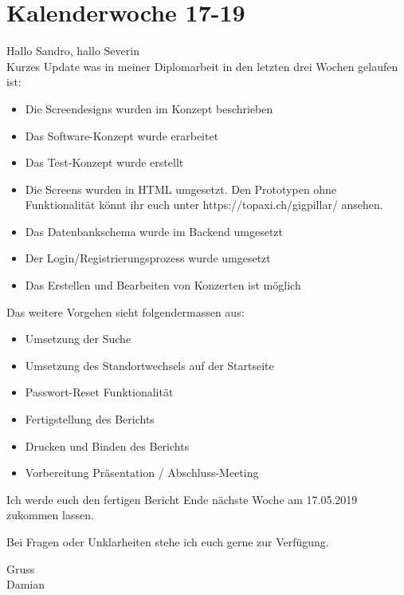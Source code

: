 \section{Kalenderwoche 17-19}

Hallo Sandro, hallo Severin\\

\noindent
Kurzes Update was in meiner Diplomarbeit in den letzten drei
Wochen gelaufen ist:

\begin{itemize}
  \tightlist{}
  \item{}Die Screendesigns wurden im Konzept beschrieben
  \item{}Das Software-Konzept wurde erarbeitet
  \item{}Das Test-Konzept wurde erstellt
  \item{}
    Die Screens wurden in HTML umgesetzt.
    Den Prototypen ohne Funktionalität könnt ihr euch unter
    https://topaxi.ch/gigpillar/ ansehen.
  \item{}Das Datenbankschema wurde im Backend umgesetzt
  \item{}Der Login/Registrierungsprozess wurde umgesetzt
  \item{}Das Erstellen und Bearbeiten von Konzerten ist möglich
\end{itemize}

\noindent
Das weitere Vorgehen sieht folgendermassen aus:

\begin{itemize}
  \tightlist{}
  \item{}Umsetzung der Suche
  \item{}Umsetzung des Standortwechsels auf der Startseite
  \item{}Passwort-Reset Funktionalität
  \item{}Fertigstellung des Berichts
  \item{}Drucken und Binden des Berichts
  \item{}Vorbereitung Präsentation / Abschluss-Meeting
\end{itemize}

\noindent
Ich werde euch den fertigen Bericht Ende nächste Woche am 17.05.2019
zukommen lassen.

\noindent
Bei Fragen oder Unklarheiten stehe ich euch gerne zur
Verfügung.

\noindent
Gruss\\
Damian
